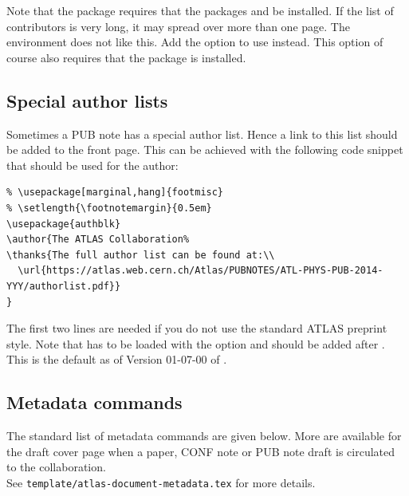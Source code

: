 Note that the  package requires that the packages 
 and  be installed.
If the list of contributors is very long, it may spread over more than one page.
The  environment does not like this.
Add the option  to use  instead.
This option of course also requires that the package  is installed.


\subsection{Special author lists}

Sometimes a PUB note has a special author list.
Hence a link to this list should be added to the front page.
This can be achieved with the following code snippet that should be used for the author:
\begin{verbatim}
% \usepackage[marginal,hang]{footmisc}
% \setlength{\footnotemargin}{0.5em}
\usepackage{authblk}
\author{The ATLAS Collaboration%
\thanks{The full author list can be found at:\\
  \url{https://atlas.web.cern.ch/Atlas/PUBNOTES/ATL-PHYS-PUB-2014-YYY/authorlist.pdf}}
}
\end{verbatim}

The first two lines are needed if you do not use the standard ATLAS preprint style.
Note that  has to be loaded with the option 
and  should be added after \verb||.
This is the default as of Version 01-07-00 of .


\subsection{Metadata commands}

The standard list of metadata commands are given below.
More are available for the draft cover page when a paper, CONF note or PUB note draft
is circulated to the collaboration.\\
See \texttt{template/atlas-document-metadata.tex} for more details.

